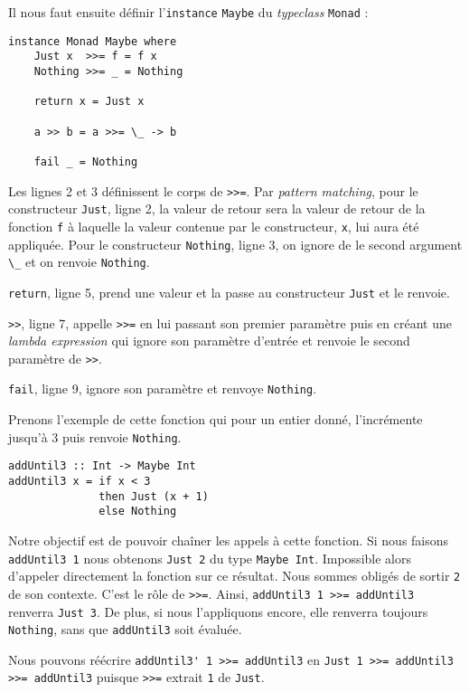 \documentclass{llncs}
\begin{document}
Il nous faut ensuite définir l'\lstinline{instance} \lstinline{Maybe} du \emph{typeclass}
\lstinline{Monad} :
\begin{lstlisting}
instance Monad Maybe where
    Just x  >>= f = f x
    Nothing >>= _ = Nothing

    return x = Just x

    a >> b = a >>= \_ -> b

    fail _ = Nothing
\end{lstlisting}

Les lignes 2 et 3 définissent le corps de \lstinline{>>=}.
Par \emph{pattern matching}, pour le constructeur \lstinline{Just}, ligne 2,
la valeur de retour sera la valeur de retour de la fonction \lstinline{f} à
laquelle la valeur contenue par le constructeur, \lstinline{x}, lui aura été appliquée.
Pour le constructeur \lstinline{Nothing}, ligne 3, on ignore de le second argument
\lstinline{\_} et on renvoie \lstinline{Nothing}.

\lstinline{return}, ligne 5, prend une valeur et la passe au constructeur
\lstinline{Just} et le renvoie.

\lstinline{>>}, ligne 7, appelle \lstinline{>>=} en lui passant son premier paramètre
puis en créant une \emph{lambda expression} qui ignore son paramètre d'entrée
et renvoie le second paramètre de \lstinline{>>}.

\lstinline{fail}, ligne 9, ignore son paramètre et renvoye \lstinline{Nothing}.

Prenons l'exemple de cette fonction qui pour un entier donné, l'incrémente jusqu'à
3 puis renvoie \lstinline{Nothing}.
\begin{lstlisting}
addUntil3 :: Int -> Maybe Int
addUntil3 x = if x < 3
              then Just (x + 1)
              else Nothing
\end{lstlisting}

Notre objectif est de pouvoir chaîner les appels à cette fonction.
Si nous faisons \lstinline{addUntil3 1} nous obtenons \lstinline{Just 2} du type \lstinline{Maybe Int}.
Impossible alors d'appeler directement la fonction sur ce résultat.
Nous sommes obligés de sortir \lstinline{2} de son contexte.
C'est le rôle de \lstinline{>>=}.
Ainsi, \lstinline{addUntil3 1 >>= addUntil3} renverra \lstinline{Just 3}.
De plus, si nous l'appliquons encore, elle renverra toujours \lstinline{Nothing},
sans que \lstinline{addUntil3} soit évaluée.

Nous pouvons réécrire \lstinline{addUntil3' 1 >>= addUntil3} en \lstinline{Just 1 >>= addUntil3 >>= addUntil3}
puisque \lstinline{>>=} extrait \lstinline{1} de \lstinline{Just}.
\end{document}
